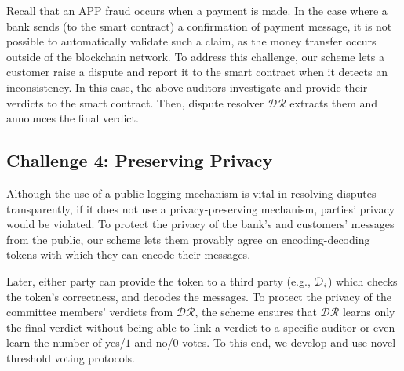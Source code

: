  Recall that an APP fraud occurs when a payment is made. In the case where a  bank sends  (to the smart contract) a confirmation of payment message, it is not possible to automatically validate such a claim, as the money transfer occurs outside of the blockchain network. To address this challenge, our scheme lets a customer raise a dispute and report it to the smart contract when it detects an inconsistency. In this case, the above auditors investigate and provide their verdicts to the smart contract. Then, dispute resolver $\mathcal{DR}$ extracts them and announces the final verdict. 


\vspace{-1.1mm}
\subsection{Challenge 4: Preserving Privacy}

 Although the use of a public logging mechanism is vital in resolving disputes transparently, if it does not use a  privacy-preserving mechanism, parties' privacy would be violated. To protect the privacy of the bank's and customers' messages from the public, our scheme lets them provably agree on encoding-decoding tokens with which they can encode their messages. 
 
 Later, either party can provide the token to a third party  (e.g., $\mathcal{D}_{\scriptscriptstyle i}$) which checks the token's correctness, and decodes the messages. To protect the privacy of the committee members' verdicts from $\mathcal{DR}$, the scheme ensures that  $\mathcal{DR}$  learns only the final verdict without being able to link a verdict to a specific auditor or even learn the number of yes/$1$ and no/$0$ votes. To this end, we develop and use novel threshold voting protocols. 
 
 
 
 